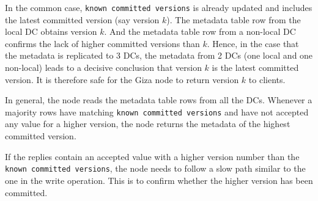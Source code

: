 In the common case,
{\tt known committed versions} is already updated and includes the latest committed version (say version $k$).
The metadata table row from the local DC obtains version $k$.
And the metadata table row from a non-local DC confirms the lack of higher committed versions than $k$.
Hence, in the case that the metadata is replicated to 3 DCs,
the metadata from 2 DCs (one local and one non-local) leads to a decisive conclusion that version $k$ is the latest committed version.
It is therefore safe for the Giza node to return version $k$ to clients.

In general, the \name node reads the metadata table rows from all the DCs.
Whenever a majority rows have matching {\tt known committed versions}
and have not accepted any value for a higher version, 
the \name node returns the metadata of the highest committed version.

If the replies contain an accepted value with a higher version number than the {\tt known committed versions},
the \name node needs to follow a slow path similar to the one in the write operation.
This is to confirm whether the higher version has been committed.



